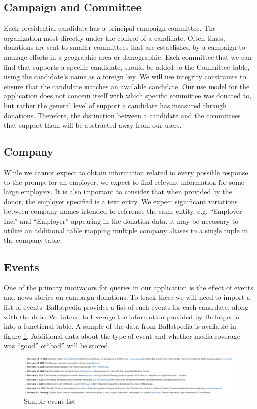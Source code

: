 \documentclass[12pt]{article}
\begin{document}
    \subsection{Campaign and Committee}
    Each presidential candidate has a principal campaign committee. The organization most directly under the control of a candidate. Often times, donations are sent to smaller committees that are established by a campaign to manage efforts in a geographic area or demographic. Each committee that we can find that supports a specific candidate, should be added to the Committee table, using the candidate's name as a foreign key. We will use integrity constraints to ensure that the candidate matches an available candidate. Our use model for the application does not concern itself with which specific committee was donated to, but rather the general level of support a candidate has measured through donations. Therefore, the distinction between a candidate and the committees that support them will be abstracted away from our users. 
    \subsection{Company}
    While we cannot expect to obtain information related to every possible response to the prompt for an employer, we expect to find relevant information for some large employers. It is also important to consider that when provided by the donor, the employer specified is a text entry. We expect significant variations between company names intended to reference the same entity, e.g. ``Employer Inc.'' and ``Employer'' appearing in the donation data. It may be necessary to utilize an additional table mapping multiple company aliases to a single tuple in the company table. 
    \subsection{Events}
    One of the primary motivators for queries in our application is the effect of events and news stories on campaign donations. To track these we will need to import a list of events. Ballotpedia provides a list of such events for each candidate, along with the date. We intend to leverage the information provided by Ballotpedia into a functional table. A sample of the data from Ballotpedia is available in figure \ref{fig:events}. Additional data about the type of event and whether media coverage was ``good'' or``bad'' will be stored. 
        \begin{figure}[H]
            \begin{center}
            \includegraphics[scale=.40]{events}
            \caption{Sample event list}
            \label{fig:events}
            \end{center}
        \end{figure}
\end{document}
